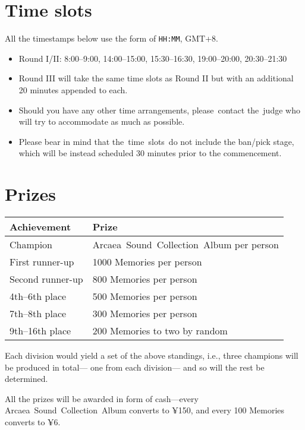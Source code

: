 \documentclass{article}
\begin{document}
\section{Time slots}

All the timestamps below use the form of
\texttt{HH:MM}, GMT+8.

\begin{itemize}
	\item Round I/II: 8:00--9:00, 14:00--15:00, 15:30--16:30, 19:00--20:00, 20:30--21:30

	\item Round III will take the same time slots as Round II
	      but with an additional 20 minutes appended to each.

	\item Should you have any other time arrangements,
	      please contact the judge who will
	      try to accommodate as much as possible.

	\item Please bear in mind that
	      the time slots do not include the ban/pick stage,
	      which will be instead scheduled 30 minutes prior to the commencement.
\end{itemize}

\section{Prizes}

\begin{table}[!htbp]
	\centering
	\begin{tabular}{ll}
		\hline
		Achievement  %
		                 & Prize                                    \\ \hline
		Champion         & Arcaea Sound Collection Album per person \\
		First runner-up  & 1000 Memories per person                 \\
		Second runner-up & 800 Memories per person                  \\
		4th--6th place   & 500 Memories per person                  \\
		7th--8th place   & 300 Memories per person                  \\
		9th--16th place  & 200 Memories to two by random            \\ \hline
	\end{tabular}
\end{table}

Each division would yield a set of the above standings,
i.e.,
three champions will be produced in total---%
one from each division---%
and so will the rest be determined.

All the prizes will be awarded in form of  %
cash---every Arcaea Sound Collection Album converts to ¥150,
and every 100 Memories converts  %
to ¥6.
\end{document}
